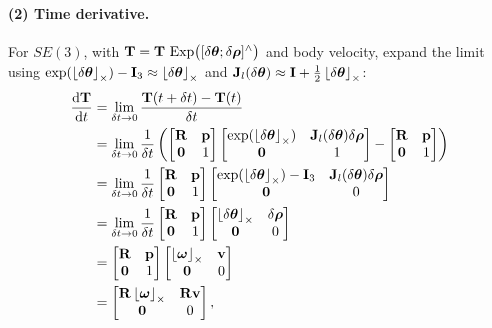\paragraph{(2) Time derivative.} For $SE(3)$, with $\vect{T} = \vect{T}\,\Exp\!\big([\delta\vect{\theta};\delta\vect{\rho}]^{\wedge}\big)$ and body velocity, expand the limit using $\exp(\skewsym{\delta\vect{\theta}})-\vect{I}_3\approx\skewsym{\delta\vect{\theta}}$ and $\vect{J}_l(\delta\vect{\theta})\approx\vect{I}+\tfrac12\skewsym{\delta\vect{\theta}}$:
\begin{align}
\frac{\mathrm{d}\vect{T}}{\mathrm{d}t}
&= \lim_{\delta t\to0}\frac{\vect{T}(t+\delta t)-\vect{T}(t)}{\delta t} \\
&= \lim_{\delta t\to0}\frac{1}{\delta t}\left(\begin{bmatrix}\vect{R}&\vect{p}\\\vect{0}&1\end{bmatrix}\begin{bmatrix}\exp(\skewsym{\delta\vect{\theta}}) & \vect{J}_l(\delta\vect{\theta})\delta\vect{\rho}\\\vect{0}&1\end{bmatrix} - \begin{bmatrix}\vect{R}&\vect{p}\\\vect{0}&1\end{bmatrix}\right) \\
&= \lim_{\delta t\to0}\frac{1}{\delta t}\begin{bmatrix}\vect{R}&\vect{p}\\\vect{0}&1\end{bmatrix}\begin{bmatrix}\exp(\skewsym{\delta\vect{\theta}})-\vect{I}_3 & \vect{J}_l(\delta\vect{\theta})\delta\vect{\rho}\\\vect{0}&0\end{bmatrix} \\
&= \lim_{\delta t\to0}\frac{1}{\delta t}\begin{bmatrix}\vect{R}&\vect{p}\\\vect{0}&1\end{bmatrix}\begin{bmatrix}\skewsym{\delta\vect{\theta}} & \delta\vect{\rho}\\\vect{0}&0\end{bmatrix} \\
&= \begin{bmatrix}\vect{R}&\vect{p}\\\vect{0}&1\end{bmatrix}\begin{bmatrix}\skewsym{\vect{\omega}} & \vect{v}\\\vect{0}&0\end{bmatrix} \\
&= \begin{bmatrix}\vect{R}\skewsym{\vect{\omega}} & \vect{R}\vect{v}\\\vect{0}&0\end{bmatrix},
\end{align}
